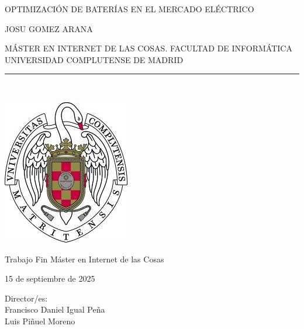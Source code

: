 \newpage

\thispagestyle{empty}

\begin{center}

  \vspace{1cm}

  {\large OPTIMIZACIÓN DE BATERÍAS EN EL MERCADO ELÉCTRICO}\\

  \vspace{0.5cm}

  \vspace{0.5cm}

  {\large JOSU GOMEZ ARANA}\\

  \vspace{0.5cm}

  MÁSTER EN INTERNET DE LAS COSAS. FACULTAD DE INFORMÁTICA\\
  UNIVERSIDAD COMPLUTENSE DE MADRID\\

  \vspace{0.65cm}

  \rule{2in}{0.5pt}\\

  \vspace{0.85cm}

  \includegraphics[height=2.5in]{figures/escudo.jpg}

  \vspace{0.5cm}

  Trabajo Fin Máster en Internet de las Cosas

  \vspace{0.5cm}

  15 de septiembre de 2025\\

  \vspace{1cm}

\end{center}

{
  \raggedleft
  Director/es:\\
  \vspace{1cm}
  Francisco Daniel Igual Peña\\
  Luis Piñuel Moreno\\
}
